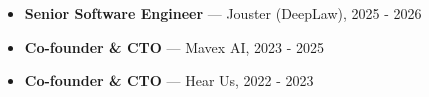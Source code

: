 {
    \begin{itemize}
      \item \textbf{Senior Software Engineer} --- Jouster (DeepLaw), 2025 - 2026
      \vspace{0.12cm}
      \item \textbf{Co-founder \& CTO} --- Mavex AI, 2023 - 2025
      \item \textbf{Co-founder \& CTO} --- Hear Us, 2022 - 2023
    \end{itemize}
}

